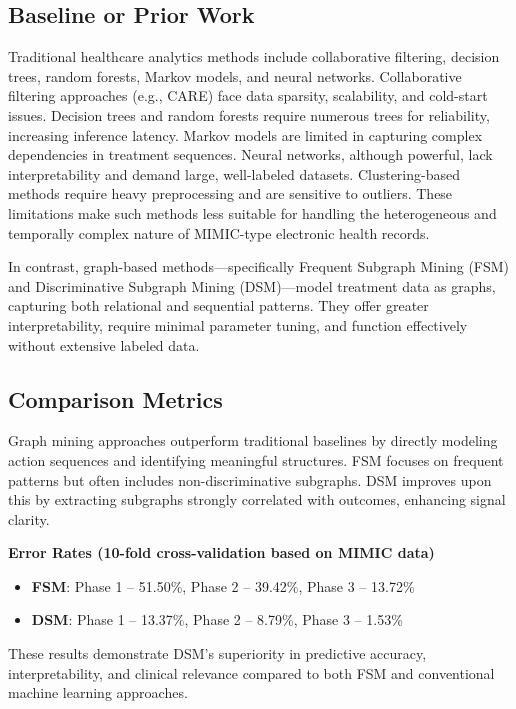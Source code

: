 \documentclass[10pt]{article}
\begin{document}
\subsection*{Baseline or Prior Work}

Traditional healthcare analytics methods include collaborative filtering, decision trees, random forests, Markov models, and neural networks. Collaborative filtering approaches (e.g., CARE) face data sparsity, scalability, and cold-start issues. Decision trees and random forests require numerous trees for reliability, increasing inference latency. Markov models are limited in capturing complex dependencies in treatment sequences. Neural networks, although powerful, lack interpretability and demand large, well-labeled datasets. Clustering-based methods require heavy preprocessing and are sensitive to outliers. These limitations make such methods less suitable for handling the heterogeneous and temporally complex nature of MIMIC-type electronic health records.

In contrast, graph-based methods—specifically Frequent Subgraph Mining (FSM) and Discriminative Subgraph Mining (DSM)—model treatment data as graphs, capturing both relational and sequential patterns. They offer greater interpretability, require minimal parameter tuning, and function effectively without extensive labeled data.

\subsection*{Comparison Metrics}

Graph mining approaches outperform traditional baselines by directly modeling action sequences and identifying meaningful structures. FSM focuses on frequent patterns but often includes non-discriminative subgraphs. DSM improves upon this by extracting subgraphs strongly correlated with outcomes, enhancing signal clarity.

\textbf{Error Rates (10-fold cross-validation based on MIMIC data)}
\begin{itemize}[noitemsep]
  \item \textbf{FSM}: Phase 1 – 51.50\%, Phase 2 – 39.42\%, Phase 3 – 13.72\%
  \item \textbf{DSM}: Phase 1 – 13.37\%, Phase 2 – 8.79\%, Phase 3 – 1.53\%
\end{itemize}

These results demonstrate DSM’s superiority in predictive accuracy, interpretability, and clinical relevance compared to both FSM and conventional machine learning approaches.
\end{document}
